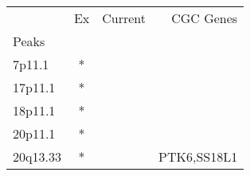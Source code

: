 \begin{tabular}{lccr}
\toprule
{} & Ex & Current &    CGC Genes \\
Peaks    &    &         &              \\
\midrule
7p11.1   &  * &         &              \\
17p11.1  &  * &         &              \\
18p11.1  &  * &         &              \\
20p11.1  &  * &         &              \\
20q13.33 &  * &         &  PTK6,SS18L1 \\
\bottomrule
\end{tabular}
